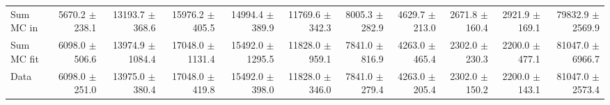 \begin{table}[htbp]
{\begin{tabular}{lrrrrrrrrrr}
\hline
Sum MC in & 5670.2 $\pm$ 238.1 & 13193.7 $\pm$ 368.6 & 15976.2 $\pm$ 405.5 & 14994.4 $\pm$ 389.9 & 11769.6 $\pm$ 342.3 & 8005.3 $\pm$ 282.9 & 4629.7 $\pm$ 213.0 & 2671.8 $\pm$ 160.4 & 2921.9 $\pm$ 169.1& 79832.9 $\pm$ 2569.9 \\
Sum MC fit & 6098.0 $\pm$ 506.6 & 13974.9 $\pm$ 1084.4 & 17048.0 $\pm$ 1131.4 & 15492.0 $\pm$ 1295.5 & 11828.0 $\pm$ 959.1 & 7841.0 $\pm$ 816.9 & 4263.0 $\pm$ 465.4 & 2302.0 $\pm$ 230.3 & 2200.0 $\pm$ 477.1 & 81047.0 $\pm$ 6966.7 \\
\hline
Data & 6098.0 $\pm$ 251.0 & 13975.0 $\pm$ 380.4 & 17048.0 $\pm$ 419.8 & 15492.0 $\pm$ 398.0 & 11828.0 $\pm$ 346.0 & 7841.0 $\pm$ 279.4 & 4263.0 $\pm$ 205.4 & 2302.0 $\pm$ 150.2 & 2200.0 $\pm$ 143.1 & 81047.0 $\pm$ 2573.4 \\
\hline
\end{tabular}
}
\end{table}
